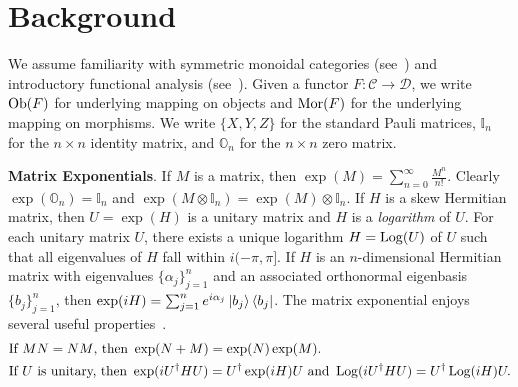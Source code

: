 \section{Background}
\label{Sect:Background}

We assume familiarity with symmetric monoidal categories (see~\cite{MacLane2010}) and introductory functional analysis (see~\cite{Hall2015}).
Given a functor $F: \mathcal{C} \to \mathcal{D}$, we write $\operatorname{Ob}( F )$ for underlying mapping on objects and $\operatorname{Mor}( F )$ for the underlying mapping on morphisms.
We write $\{ X, Y, Z \}$ for the standard Pauli matrices, $\mathbb{I}_n$ for the $n \times n$ identity matrix, and $\mathbb{O}_n$ for the $n \times n$ zero matrix.

\vspace{1em}
\noindent
\textbf{Matrix Exponentials}.
%
If $M$ is a matrix, then $\exp( M ) = \sum_{n=0}^{\infty} \frac{M^n}{n!}$.
Clearly $\exp( \mathbb{O}_n ) = \mathbb{I}_n$ and $\exp( M \otimes \mathbb{I}_n ) = \exp( M ) \otimes \mathbb{I}_n$.
If $H$ is a skew Hermitian matrix, then $U = \exp( H )$ is a unitary matrix and $H$ is a \emph{logarithm} of $U$.
For each unitary matrix $U$, there exists a unique logarithm $H = \operatorname{Log}( U )$ of $U$ such that all eigenvalues of $H$ fall within $i ( -\pi, \pi ]$.
If $H$ is an $n$-dimensional Hermitian matrix with eigenvalues $\{ \alpha_j \}_{j=1}^n$ and an associated orthonormal eigenbasis $\{ b_j \}_{j=1}^n$, then $\exp( iH ) = \sum_{j=1}^n e^{i\alpha_j} \ket{b_j} \bra{b_j}$.
The matrix exponential enjoys several useful properties~\cite{Hall2015}.
\begin{align}
    &\text{If } MN = NM \text{, then } \exp( N + M ) = \exp( N ) \exp( M ).\label{Eqn:SimulDiag}
    \\
    &\text{If } U \text{ is unitary, then } \exp( i{U^\dagger}HU) = U^\dagger \exp( iH ) U \text{ and } \operatorname{Log}( i{U^\dagger}HU) = U^\dagger \operatorname{Log}( iH ) U.\label{Eqn:UnitaryConj}
\end{align}

